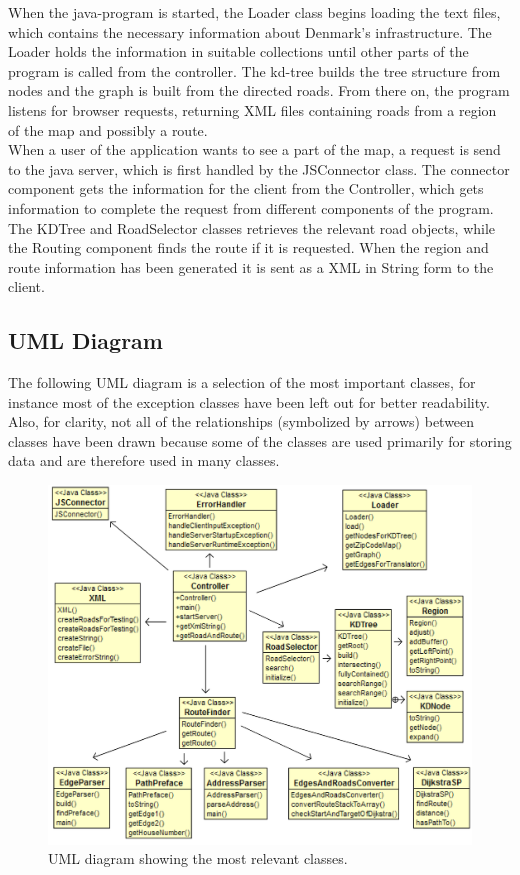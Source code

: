 \documentclass[a4paper,10pt,titlepage]{article}
\begin{document}
		When the java-program is started, the Loader class begins loading the text files, which contains the necessary information about Denmark’s infrastructure. The Loader holds the information in suitable collections until other parts of the program is called from the controller. The kd-tree builds the tree structure from nodes and the graph is built from the directed roads. From there on, the program listens for browser requests, returning XML files containing roads from a region of the map and possibly a route.\\
When a user of the application wants to see a part of the map, a request is send to the java server, which is first handled by the JSConnector class.  The connector component gets the information for the client from the Controller, which gets information to complete the request from different components of the program. The KDTree and RoadSelector classes retrieves the relevant road objects, while the Routing component finds the route if it is requested. When the region and route information has been generated it is sent as a XML in String form to the client. 

		\subsection{UML Diagram}
		The following UML diagram is a selection of the most important classes, for instance most of the exception classes have been left out for better readability. Also, for clarity, not all of the relationships (symbolized by arrows) between classes have been drawn because some of the classes are used primarily for storing data and are therefore used in many classes. 
		\begin{figure}[H]
\includegraphics[width=120mm]{umlArrows.png}
\caption{UML diagram showing the most relevant classes.}
\label{fig:uml}
\end{figure}
		
\end{document}
